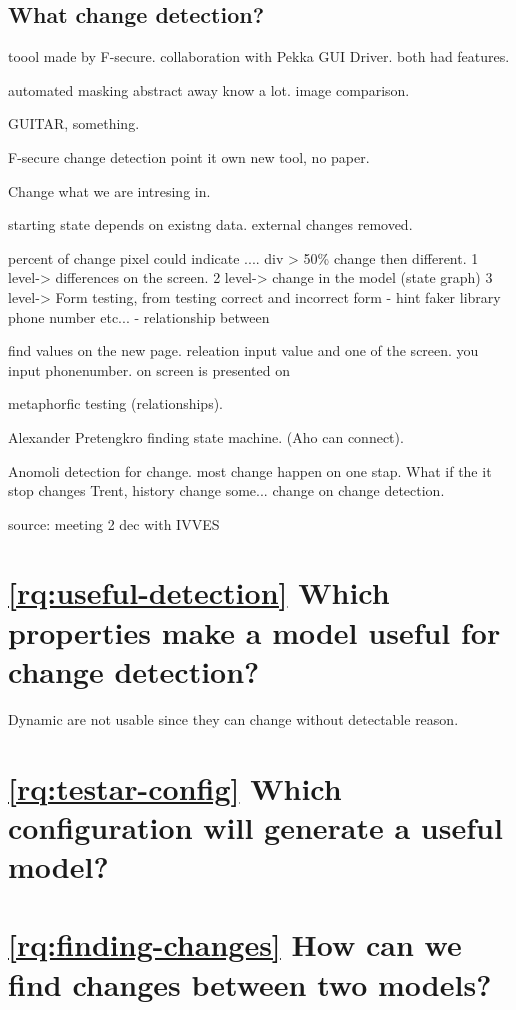\subsection{What change detection?}

toool made by F-secure. collaboration with Pekka GUI Driver. both had features. 

automated masking abstract away know a lot. image comparison. 

GUITAR, something. 

F-secure change detection point it own 
new tool, no paper. 

Change what we are intresing in.

starting state depends on existng data. external changes removed. 

percent of change pixel could indicate .... div > 50\% change then different. 
1 level-> differences on the screen.
2 level-> change in the model (state graph)
3 level-> Form testing, from testing correct and incorrect form
 - hint faker library phone number etc...
 - relationship between 

find values on the new page. releation input value and one of the screen. you input phonenumber. on screen is presented on

metaphorfic testing (relationships). 

Alexander Pretengkro finding state machine. (Aho can connect).

Anomoli detection for change. most change happen on one stap. What if the it stop changes Trent, history change some... change on change detection. 
 
 source: meeting 2 dec with IVVES 
 
\section{\ref{rq:useful-detection} Which properties make a model useful for change detection?}

Dynamic are not usable since they can change without detectable reason. \cite{mulders2022Statemodel}

\section{\ref{rq:testar-config} Which \testar configuration will generate a useful model?}
\section{\ref{rq:finding-changes} How can we find changes between two models?}

